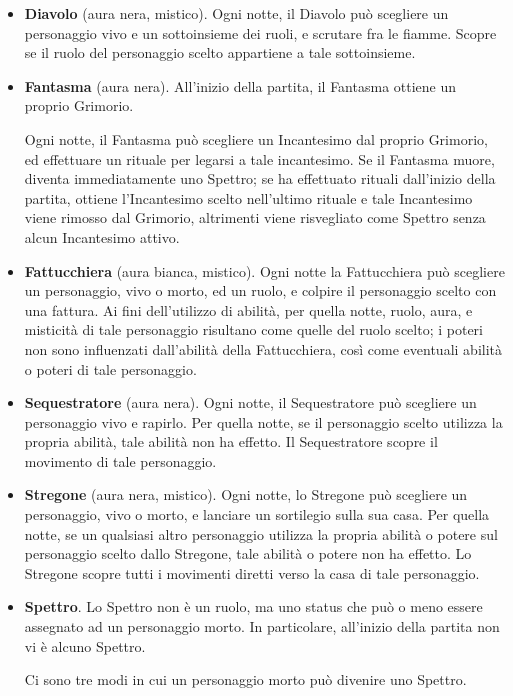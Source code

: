 \documentclass[a4paper,10pt]{article}
\begin{document}
\begin{itemize}
	\item {\bf Diavolo} (aura nera, mistico). Ogni notte, il Diavolo può scegliere un personaggio vivo e un sottoinsieme dei ruoli, e scrutare fra le fiamme. Scopre se il ruolo del personaggio scelto appartiene a tale sottoinsieme.
 
	\item {\bf Fantasma} (aura nera). All'inizio della partita, il Fantasma ottiene un proprio Grimorio.
	
	Ogni notte, il Fantasma può scegliere un Incantesimo dal proprio Grimorio, ed effettuare un rituale per legarsi a tale incantesimo. Se il Fantasma muore, diventa immediatamente uno Spettro; se ha effettuato rituali dall'inizio della partita, ottiene l'Incantesimo scelto nell'ultimo rituale e tale Incantesimo viene rimosso dal Grimorio, altrimenti viene risvegliato come Spettro senza alcun Incantesimo attivo.
 
	\item {\bf Fattucchiera} (aura bianca, mistico). Ogni notte la Fattucchiera può scegliere un personaggio, vivo o morto, ed un ruolo, e colpire il personaggio scelto con una fattura. Ai fini dell'utilizzo di abilità, per quella notte, ruolo, aura, e misticità di tale personaggio risultano come quelle del ruolo scelto; i poteri non sono influenzati dall'abilità della Fattucchiera, così come eventuali abilità o poteri di tale personaggio.

	\item {\bf Sequestratore} (aura nera). Ogni notte, il Sequestratore può scegliere un personaggio vivo e rapirlo. Per quella notte, se il personaggio scelto utilizza la propria abilità, tale abilità non ha effetto. Il Sequestratore scopre il movimento di tale personaggio.
	
	\item {\bf Stregone} (aura nera, mistico). Ogni notte, lo Stregone può scegliere un personaggio, vivo o morto, e lanciare un sortilegio sulla sua casa. Per quella notte, se un qualsiasi altro personaggio utilizza la propria abilità o potere sul personaggio scelto dallo Stregone, tale abilità o potere non ha effetto. Lo Stregone scopre tutti i movimenti diretti verso la casa di tale personaggio.

	\item {\bf Spettro}. Lo Spettro non è un ruolo, ma uno status che può o meno essere assegnato ad un personaggio morto. In particolare, all'inizio della partita non vi è alcuno Spettro.
	
	Ci sono tre modi in cui un personaggio morto può divenire uno Spettro.
	

\end{itemize}
\end{document}
